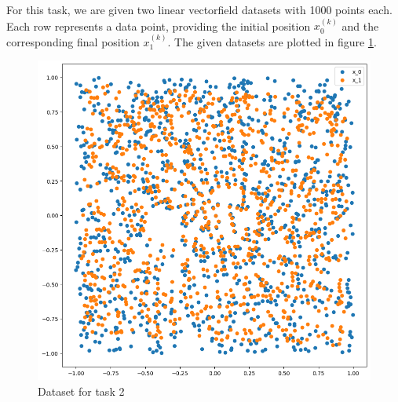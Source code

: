 
For this task, we are given two linear vectorfield datasets with 1000 points each. Each row represents a data point, providing the initial position $x_0^{(k)}$ and the corresponding final position $x_1^{(k)}$. The given datasets are plotted in figure \ref{fig:task2data}.

    \begin{figure}[H]
        \centering
        \includegraphics[width=0.5\linewidth]{images/Ex5task2_data.png}
        \caption{Dataset for task 2}
        \label{fig:task2data}
    \end{figure}


